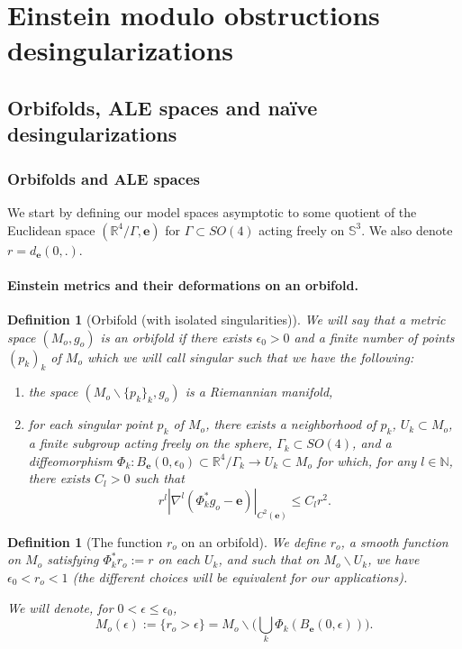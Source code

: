 \documentclass[12pt]{article}
\newtheorem{defn}[thm]{Definition}
\begin{document}
\appendix



  \section{Einstein modulo obstructions desingularizations}

\subsection{Orbifolds, ALE spaces and naïve desingularizations}

\subsubsection{Orbifolds and ALE spaces}

We start by defining our model spaces asymptotic to some quotient of the Euclidean space $(\mathbb{R}^4\slash\Gamma,\mathbf{e})$ for $\Gamma\subset SO(4)$ acting freely on $\mathbb{S}^3$. We also denote $r=d_\mathbf{e}(0,.)$.

\paragraph{Einstein metrics and their deformations on an orbifold.}

\begin{defn}[Orbifold (with isolated singularities)]\label{orb Ein}
    We will say that a metric space $(M_o,g_o)$ is an orbifold if there exists $\epsilon_0>0$ and a finite number of points $(p_k)_k$ of $M_o$ which we will call \emph{singular} such that we have the following:
    \begin{enumerate}
        \item the space $(M_o\backslash\{p_k\}_k,g_o)$ is a Riemannian manifold,
        \item for each singular point $p_k$ of $M_o$, there exists a neighborhood of $p_k$, $ U_k\subset M_o$, a finite subgroup acting freely on the sphere, $\Gamma_k\subset SO(4)$, and a diffeomorphism $ \Phi_k: B_\mathbf{e}(0,\epsilon_0)\subset\mathbb{R}^4\slash\Gamma_k \to U_k\subset M_o $ for which, for any $l\in \mathbb{N}$, there exists $C_l>0$ such that $$r^l|\nabla^l(\Phi_k^* g_o - \mathbf{e})|_{C^2(\mathbf{e})}\leqslant C_l r^2.$$
    \end{enumerate}
\end{defn}

\begin{defn}[The function $r_o$ on an orbifold]\label{ro}
    We define $r_o$, a smooth function on $M_o$ satisfying $\Phi_k^*r_o:=  r$ on each $U_k$, and such that on $M_o\backslash U_k$, we have $\epsilon_0<r_o<1$ (the different choices will be equivalent for our applications).
    
    We will denote, for $0<\epsilon\leqslant\epsilon_0$, $$M_o(\epsilon):= \{r_o>\epsilon\} = M_o\backslash  \Big(\bigcup_k \Phi_k(B_\mathbf{e}(0,\epsilon)) \Big).$$
\end{defn}
\end{document}
